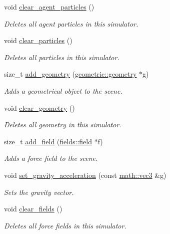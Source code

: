 \begin{DoxyCompactItemize}
void \hyperlink{classphysim_1_1simulator_a903bf3d4f155e8e524d4031b24042142}{clear\+\_\+agent\+\_\+particles} ()
\begin{DoxyCompactList}\small\item\em Deletes all agent particles in this simulator. \end{DoxyCompactList}\item 
void \hyperlink{classphysim_1_1simulator_ade81dc85cbad0e86fc38b29f48fedcd6}{clear\+\_\+particles} ()
\begin{DoxyCompactList}\small\item\em Deletes all particles in this simulator. \end{DoxyCompactList}\item 
size\+\_\+t \hyperlink{classphysim_1_1simulator_a92a79231495f047789176a19857735ff}{add\+\_\+geometry} (\hyperlink{classphysim_1_1geometric_1_1geometry}{geometric\+::geometry} $\ast$g)
\begin{DoxyCompactList}\small\item\em Adds a geometrical object to the scene. \end{DoxyCompactList}\item 
void \hyperlink{classphysim_1_1simulator_a8112f43801df68b3140458d1915c8d97}{clear\+\_\+geometry} ()
\begin{DoxyCompactList}\small\item\em Deletes all geometry in this simulator. \end{DoxyCompactList}\item 
size\+\_\+t \hyperlink{classphysim_1_1simulator_afb7ded1049ec82f7ea8d908c5cefaff7}{add\+\_\+field} (\hyperlink{classphysim_1_1fields_1_1field}{fields\+::field} $\ast$f)
\begin{DoxyCompactList}\small\item\em Adds a force field to the scene. \end{DoxyCompactList}\item 
void \hyperlink{classphysim_1_1simulator_a11d8e86465d367b9907bd541964d5a4b}{set\+\_\+gravity\+\_\+acceleration} (const \hyperlink{structphysim_1_1math_1_1vec3}{math\+::vec3} \&g)
\begin{DoxyCompactList}\small\item\em Sets the gravity vector. \end{DoxyCompactList}\item 
void \hyperlink{classphysim_1_1simulator_afe53c23ae11f78166576ad44f56ee953}{clear\+\_\+fields} ()
\begin{DoxyCompactList}\small\item\em Deletes all force fields in this simulator. \end{DoxyCompactList}\item 

\end{DoxyCompactItemize}

